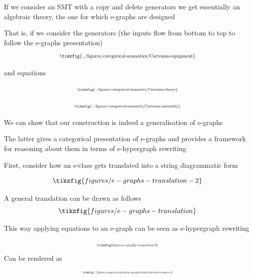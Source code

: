 \documentclass[aspectratio=169]{beamer}
\begin{document}
\begin{frame}{}
    If we consider an SMT with a copy and delete generators we get essentially an algebraic theory, the one for which e-graphs are designed

    That is, if we consider the generators (the inputs flow from bottom to top to follow the e-graphs presentation)
    \[
	\scalebox{0.7}{
  	 \tikzfig{../figures/categorical-semantics/Cartesian-equipment}
	}
    \]

    and equations

    \begin{minipage}{0.4\linewidth}
        \[
            \scalebox{0.55}{
            \tikzfig{../figures/categorical-semantics/Cartesian-theory}	
            }
            \]
    \end{minipage}
    \hfill
    \begin{minipage}{0.5\linewidth}
        \[
            \scalebox{0.55}{
            \tikzfig{../figures/categorical-semantics/Cartesian-naturality}
            }
        \]
    \end{minipage}


    We can show that our construction is indeed a generalisation of e-graphs

    The latter gives a categorical presentation of e-graphs and provides a framework for reasoning about them in terms of e-hypergraph rewriting
\end{frame}

\begin{frame}{}
    First, consider how an e-class gets translated into a string diagrammatic form

    \begin{example}
    \[
    \tikzfig{figures/e-graphs-translation-2}
    \]
    \end{example}

    A general translation can be drawn as follows
    \[
    \tikzfig{figures/e-graphs-translation}
    \]
\end{frame}

\begin{frame}{}
    \small
    This way applying equations to an e-graph can be seen as e-hypergraph rewriting

    \[
    \scalebox{0.5}{
    \tikzfig{figures/e-graphs-translation-3}
    }
    \]
    Can be rendered as
    \[
        \scalebox{0.38}{
        \tikzfig{../figures/categorical-semantics/egraph-translation-step-by-step-a-b}
        }
    \]
\end{frame}
\end{document}
